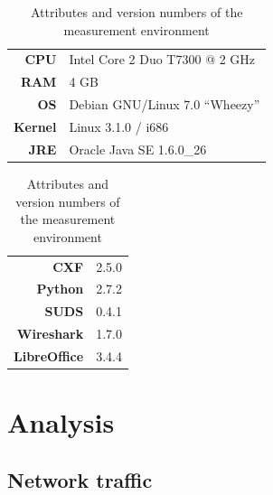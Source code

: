 \begin{table}[htbp]
 \centering
 \toprule
 \begin{minipage}[t]{0.55\linewidth}
  \centering
  \begin{tabular}{rl}
  \textbf{CPU} & Intel Core 2 Duo T7300 @ 2 GHz \\
  \textbf{RAM} & 4 GB \\
  \textbf{OS} & Debian GNU/Linux 7.0 ``Wheezy'' \\
  \textbf{Kernel} & Linux 3.1.0 / i686 \\
  \textbf{JRE} & Oracle Java SE 1.6.0\_26 \\
  \end{tabular}
 \end{minipage}
 \begin{minipage}[t]{0.3\linewidth}
  \centering
  \begin{tabular}{rl}
  \textbf{CXF} & 2.5.0 \\
  \textbf{Python} & 2.7.2 \\
  \textbf{SUDS} & 0.4.1 \\
  \textbf{Wireshark} & 1.7.0 \\
  \textbf{LibreOffice} & 3.4.4
  \end{tabular}
 \end{minipage}
 \bottomrule
 \caption{Attributes and version numbers of the measurement environment}
 \label{tab:measurenv}
\end{table}

\section{Analysis}

\subsection{Network traffic}
\label{traffic}

\begin{table}[htbp]
 \begin{center}
  
  \caption{Network traffic generated by CXF and SUDS invocation}
  \label{tab:stat_packet}
 \end{center}
\end{table}

